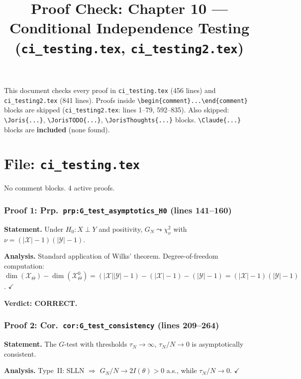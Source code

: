 \documentclass{article}
\title{Proof Check: Chapter 10 --- Conditional Independence Testing\\
(\texttt{ci\_testing.tex}, \texttt{ci\_testing2.tex})}
\date{}
\begin{document}
\maketitle

This document checks every proof in \texttt{ci\_testing.tex} (456 lines)
and \texttt{ci\_testing2.tex} (841 lines).
Proofs inside \verb|\begin{comment}...\end{comment}| blocks are skipped
(\texttt{ci\_testing2.tex}: lines 1--79, 592--835).
Also skipped: \verb|\Joris{...}|, \verb|\JorisTODO{...}|,
\verb|\JorisThoughts{...}| blocks.
\verb|\Claude{...}| blocks are \textbf{included} (none found).

\part*{File: \texttt{ci\_testing.tex}}

No comment blocks. 4 active proofs.

\section{Proof 1: Prp.\ \texttt{prp:G\_test\_asymptotics\_H0} (lines 141--160)}

\textbf{Statement.} Under $H_0:X\perp Y$ and positivity,
$G_N\leadsto\chi^2_\nu$ with $\nu=(|\mathcal{X}|-1)(|\mathcal{Y}|-1)$.

\textbf{Analysis.}
Standard application of Wilks' theorem.  Degree-of-freedom computation:
$\dim(\mathcal{X}_\Theta)-\dim(\mathcal{X}_\Theta^0)
= (|\mathcal{X}||\mathcal{Y}|-1) - (|\mathcal{X}|-1) - (|\mathcal{Y}|-1)
= (|\mathcal{X}|-1)(|\mathcal{Y}|-1)$.  $\checkmark$

\textbf{Verdict: CORRECT.}

\section{Proof 2: Cor.\ \texttt{cor:G\_test\_consistency} (lines 209--264)}

\textbf{Statement.} The $G$-test with thresholds $\tau_N\to\infty$,
$\tau_N/N\to 0$ is asymptotically consistent.

\textbf{Analysis.}
Type~II: SLLN $\Rightarrow$ $G_N/N\to 2I(\theta)>0$ a.s., while $\tau_N/N\to 0$.
$\checkmark$
\end{document}
